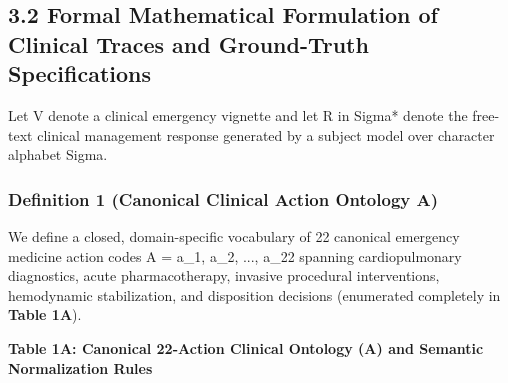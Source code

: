 \documentclass[10pt,a4paper]{article}
\begin{document}
\subsection*{3.2 Formal Mathematical Formulation of Clinical Traces and Ground-Truth Specifications}

Let V denote a clinical emergency vignette and let R in Sigma* denote the free-text clinical management response generated by a subject model over character alphabet Sigma.

\subsubsection*{Definition 1 (Canonical Clinical Action Ontology A)}
We define a closed, domain-specific vocabulary of 22 canonical emergency medicine action codes A = {a\_1, a\_2, ..., a\_22} spanning cardiopulmonary diagnostics, acute pharmacotherapy, invasive procedural interventions, hemodynamic stabilization, and disposition decisions (enumerated completely in \textbf{Table 1A}).

\textbf{Table 1A: Canonical 22-Action Clinical Ontology (A) and Semantic Normalization Rules}
\end{document}
